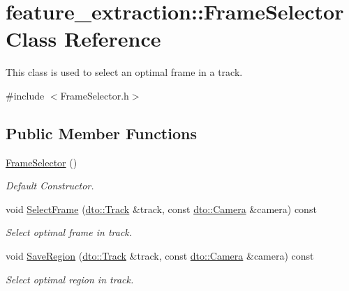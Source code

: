 \hypertarget{classfeature__extraction_1_1_frame_selector}{}\section{feature\+\_\+extraction\+:\+:Frame\+Selector Class Reference}
\label{classfeature__extraction_1_1_frame_selector}


This class is used to select an optimal frame in a track.  




{\ttfamily \#include $<$Frame\+Selector.\+h$>$}

\subsection*{Public Member Functions}
\begin{DoxyCompactItemize}
\item 
\mbox{\label{classfeature__extraction_1_1_frame_selector_abc66cb171fc455c2e93f15740a6003c6}} 
\mbox{\hyperlink{classfeature__extraction_1_1_frame_selector_abc66cb171fc455c2e93f15740a6003c6}{Frame\+Selector}} ()
\begin{DoxyCompactList}\small\item\em Default Constructor. \end{DoxyCompactList}\item 
\mbox{\label{classfeature__extraction_1_1_frame_selector_a182e9f0d1d3f02364a2590c77a023bcc}} 
void \mbox{\hyperlink{classfeature__extraction_1_1_frame_selector_a182e9f0d1d3f02364a2590c77a023bcc}{Select\+Frame}} (\mbox{\hyperlink{structdto_1_1_track}{dto\+::\+Track}} \&track, const \mbox{\hyperlink{structdto_1_1_camera}{dto\+::\+Camera}} \&camera) const
\begin{DoxyCompactList}\small\item\em Select optimal frame in track. \end{DoxyCompactList}\item 
\mbox{\label{classfeature__extraction_1_1_frame_selector_a087234d78c7f2b470db5c65e9557080d}} 
void \mbox{\hyperlink{classfeature__extraction_1_1_frame_selector_a087234d78c7f2b470db5c65e9557080d}{Save\+Region}} (\mbox{\hyperlink{structdto_1_1_track}{dto\+::\+Track}} \&track, const \mbox{\hyperlink{structdto_1_1_camera}{dto\+::\+Camera}} \&camera) const
\begin{DoxyCompactList}\small\item\em Select optimal region in track. \end{DoxyCompactList}\end{DoxyCompactItemize}


